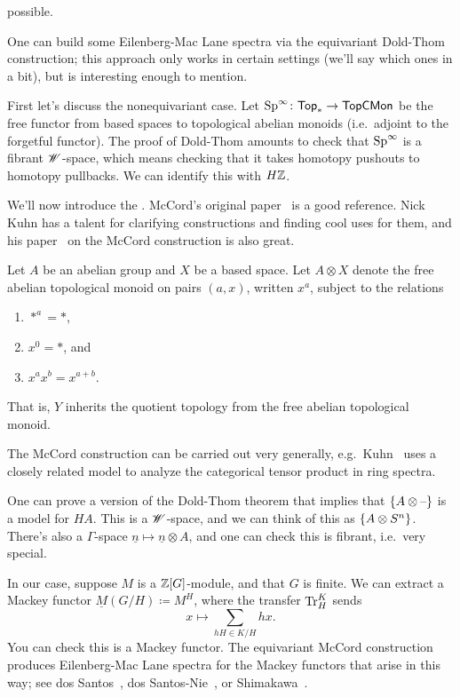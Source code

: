possible.
\begin{cons}
\label{EMcons}
One can build some Eilenberg-Mac Lane spectra via the equivariant Dold-Thom construction; this approach only works
in certain settings (we'll say which ones in a bit), but is interesting enough to mention.

First let's discuss the nonequivariant case. Let $\mathrm{Sp}^\infty\colon\mathsf{Top}_*\to\mathsf{TopCMon}$ be the free functor from
based spaces to topological abelian monoids (i.e.\ adjoint to the forgetful functor). The proof of Dold-Thom
amounts to check that $\mathrm{Sp}^\infty$ is a fibrant $\mathscr W$-space, which means checking that it takes homotopy pushouts
to homotopy pullbacks. We can identify this with $H\mathbb Z$.

We'll now introduce the . McCord's original paper~\cite{McCord} is a good reference. Nick
Kuhn has a talent for clarifying constructions and finding cool uses for them, and his paper~\cite{KuhnMcCord} on
the McCord construction is also great.

Let $A$ be an abelian group and $X$ be a based space. Let $A\otimes X$ denote the free abelian topological monoid
on pairs $(a,x)$, written $x^a$, subject to the relations
\begin{enumerate}
	\item $*^a = *$,
	\item $x^0 = *$, and
	\item $x^ax^b = x^{a+b}$.
\end{enumerate}
That is, $Y$ inherits the quotient topology from the free abelian topological monoid.
\begin{rem}
The McCord construction can be carried out very generally, e.g.\ Kuhn~\cite{KuhnMcCord} uses a closely related
model to analyze the categorical tensor product in ring spectra.
\end{rem}
One can prove a version of the Dold-Thom theorem that implies that $\{A\otimes\text{--}\}$ is a model for $HA$. This is
a $\mathscr W$-space, and we can think of this as $\{A\otimes S^n\}$. There's also a $\Gamma$-space $\underline n\mapsto
\underline n\otimes A$, and one can check this is fibrant, i.e.\ very special.

In our case, suppose $M$ is a $\mathbb Z[G]$-module, and that $G$ is finite. We can extract a Mackey functor $\underline
M(G/H)\coloneqq M^H$, where the transfer $\operatorname{Tr}_H^K$ sends
\[x\mapsto \sum_{hH\in K/H} hx.\]
You can check this is a Mackey functor. The equivariant McCord construction produces Eilenberg-Mac Lane spectra for
the Mackey functors that arise in this way; see dos Santos~\cite{dosSantos}, dos Santos-Nie~\cite{dSN09}, or
Shimakawa~\cite{Shi89}.


\end{cons}
